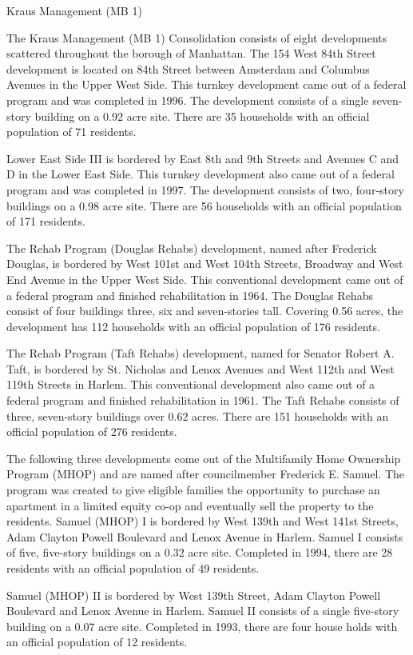 Kraus Management (MB 1)\par \vspace{.7\baselineskip}The Kraus Management (MB 1) Consolidation consists of eight developments scattered throughout the borough of Manhattan. The 154 West 84th Street development is located on 84th Street between Amsterdam and Columbus Avenues in the Upper West Side. This turnkey development came out of a federal program and was completed in 1996. The development consists of a single seven-story building on a 0.92 acre site. There are 35 households with an official population of 71 residents. \par \vspace{.7\baselineskip}Lower East Side III is bordered by East 8th and 9th Streets and Avenues C and D in the Lower East Side. This turnkey development also came out of a federal program and was completed in 1997. The development consists of two, four-story buildings on a 0.98 acre site. There are 56 households with an official population of 171 residents.\par \vspace{.7\baselineskip}The Rehab Program (Douglas Rehabs) development, named after Frederick Douglas, is bordered by West 101st and West 104th Streets, Broadway and West End Avenue in the Upper West Side. This conventional development came out of a federal program and finished rehabilitation in 1964. The Douglas Rehabs consist of four buildings three, six and seven-stories tall. Covering 0.56 acres, the development has 112 households with an official population of 176 residents. \par \vspace{.7\baselineskip}The Rehab Program (Taft Rehabs) development, named for Senator Robert A. Taft, is bordered by St. Nicholas and Lenox Avenues and West 112th and West 119th Streets in Harlem. This conventional development also came out of a federal program and finished rehabilitation in 1961. The Taft Rehabs consists of three, seven-story buildings over 0.62 acres. There are 151 households with an official population of 276 residents.\par \vspace{.7\baselineskip}The following three developments come out of the Multifamily Home Ownership Program (MHOP) and are named after councilmember Frederick E. Samuel. The program was created to give eligible families the opportunity to purchase an apartment in a limited equity co-op and eventually sell the property to the residents. Samuel (MHOP) I is bordered by West 139th and West 141st Streets, Adam Clayton Powell Boulevard and Lenox Avenue in Harlem. Samuel I consists of five, five-story buildings on a 0.32 acre site. Completed in 1994, there are 28 residents with an official population of 49 residents. \par \vspace{.7\baselineskip}Samuel (MHOP) II is bordered by West 139th Street, Adam Clayton Powell Boulevard and Lenox Avenue in Harlem. Samuel II consists of a single five-story building on a 0.07 acre site. Completed in 1993, there are four house holds with an official population of 12 residents.\par 